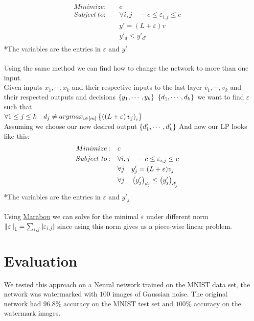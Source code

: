 \documentclass[a4paper]{llncs}
\newcommand{\guy}[1]{\marginpar{\textcolor{orange}{Guy: #1}}}
\begin{document}
\begin{align*}
    Minimize:\quad & c \\
    Subject\ to:\quad & \forall i,j\quad -c \leq\varepsilon_{i,j}\leq c\\
    & y'=(L+\varepsilon)v \\
    & y'_d \leq y'_{d'}\\
\end{align*}
\hspace*{5cm} *The variables are the entries in $\varepsilon$ and $y'$
\\\\
Using the same method we can find how to change the network to more than one input.\\
Given inputs $x_1,\cdots,x_k$ and their respective inputs to the last layer $v_1,\cdots,v_k$ and their respected outputs and decisions $\bracketsC{y_1,\cdots,y_k}\ \bracketsC{d_1,\cdots,d_k}$ we want to find $\varepsilon$ such that\\
$\forall 1\leq j\leq k\quad d_j \neq argmax_{i\in\left[m\right]}\left\lbrace \left(\left(L+\varepsilon\right)v_j\right)_i\right\rbrace$\\
Assuming we choose our new desired output
$\left\lbrace d'_1,\cdots,d'_k\right\rbrace$
And now our LP looks like this:\\
\begin{align*}
    Minimize:\quad & c \\
    Subject\ to:\quad & \forall i,j\quad -c \leq\varepsilon_{i,j}\leq c\\
    & \forall j\quad y'_j=(L+\varepsilon)v_j \\
    & \forall j\quad \left(y'_j\right)_{d_j} \leq \left(y'_j\right)_{d'_j}\\
\end{align*}
\hspace*{5cm} *The variables are the entries in $\varepsilon$ and
$y'_j$
\\\\
Using
\href{http://aisafety.stanford.edu/marabou/MarabouCAV2019.pdf}{Marabou}
we can solve for the minimal $\varepsilon$ under different norm
$\left\lVert\varepsilon\right\rVert_1=\sum_{i,j}\left\lvert\varepsilon_{i,j}\right\rvert$ since using
this norm gives us a piece-wise linear problem.

\guy{Overall, this looks good. Some stuff will need to be moved to other
sections according to the paper layout.}

\section{Evaluation}
\label{sec:evaluation}
We tested this approach on a Neural network trained on the MNIST data set, the network was watermarked with $100$ images of Gaussian noise. The original network had $96.8\text{\%}$ accuracy on the MNIST test set and $100\text{\%}$ accuracy on the watermark images.
\end{document}
